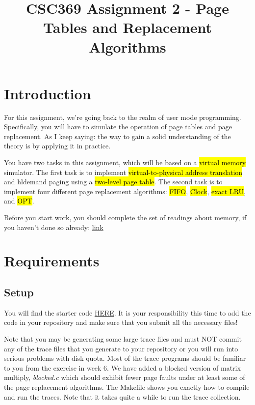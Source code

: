 \documentclass[12pt]{article}
\begin{document}
\title{CSC369 Assignment 2 - Page Tables and Replacement Algorithms}
\maketitle

\bigskip

\section{Introduction}

\bigskip

For this assignment, we're going back to the realm of user mode programming.
Specifically, you will have to simulate the operation of page tables and page
replacement. As I keep saying: the way to gain a solid understanding of the theory
is by applying it in practice.

\bigskip

\noindent You have two tasks in this assignment, which will be based on a \hl{virtual memory}
simulator. The first task is to implement \hl{virtual-to-physical address translation}
and hl{demand paging} using a \hl{two-level page table}. The second task is to implement
four different page replacement algorithms: \hl{FIFO}, \hl{Clock}, \hl{exact LRU}, and \hl{OPT}.

\bigskip

\noindent Before you start work, you should complete the set of readings about memory, if
you haven't done so already: \href{http://pages.cs.wisc.edu/~remzi/OSTEP/vm-paging.pdf}{link}

\bigskip

\section{Requirements}

\bigskip

\subsection{Setup}

\bigskip

\noindent You will find the starter code \href{https://www.teach.cs.toronto.edu//~csc369h/summer/assignments/new-a2/starter.zip}{HERE}.
It is your responsibility this time to add the code in your repository and make
sure that you submit all the necessary files!

\bigskip

\noindent Note that you may be generating some large trace files and must NOT commit any of
the trace files that you generate to your repository or you will run into serious
problems with disk quota. Most of the trace programs should be familiar to you from
the exercise in week 6. We have added a blocked version of matrix multiply, \textit{blocked.c}
which should exhibit fewer page faults under at least some of the page replacement
algorithms. The Makefile shows you exactly how to compile and run the traces. Note
that it takes quite a while to run the trace collection.
\end{document}

